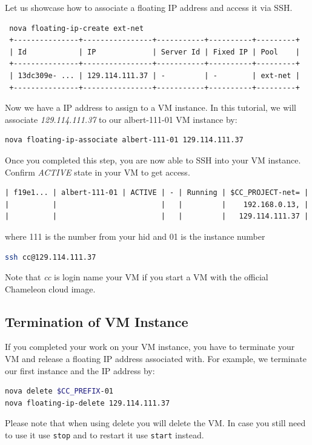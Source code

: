 Let us showcase how to associate a floating IP address and access it
via SSH.

\begin{tiny}
\begin{lstlisting}
 nova floating-ip-create ext-net
 +---------------+----------------+-----------+----------+---------+
 | Id            | IP             | Server Id | Fixed IP | Pool    |
 +---------------+----------------+-----------+----------+---------+
 | 13dc309e- ... | 129.114.111.37 | -         | -        | ext-net |
 +---------------+----------------+-----------+----------+---------+
\end{lstlisting}
\end{tiny}

Now we have a IP address to assign to a VM instance. In this tutorial,
we will associate \textit{129.114.111.37} to our
albert-111-01 VM instance by:

\begin{lstlisting}[language=bash]
nova floating-ip-associate albert-111-01 129.114.111.37
\end{lstlisting}

Once you completed this step, you are now able to SSH into your VM
instance.  Confirm \textit{ACTIVE} state in your VM to get access.

\begin{tiny}
\begin{lstlisting}
| f19e1... | albert-111-01 | ACTIVE | - | Running | $CC_PROJECT-net= |
|          |                        |   |         |    192.168.0.13, |
|          |                        |   |         |   129.114.111.37 |
\end{lstlisting}
\end{tiny}

where 111 is the number from your hid and 01 is the instance number

\begin{lstlisting}[language=bash]
ssh cc@129.114.111.37
\end{lstlisting}

Note that \textit{cc} is login name your VM if you start a VM
with the official Chameleon cloud image.

\subsection{Termination of VM Instance}

If you completed your work on your VM instance, you have to terminate
your VM and release a floating IP address associated with. For
example, we terminate our first instance and the IP address by:

\begin{lstlisting}[language=bash]
nova delete $CC_PREFIX-01
nova floating-ip-delete 129.114.111.37
\end{lstlisting}

Please note that when using delete you will delete the VM. In case you
still need to use it use \verb|stop| and to restart it use
\verb|start| instead.


